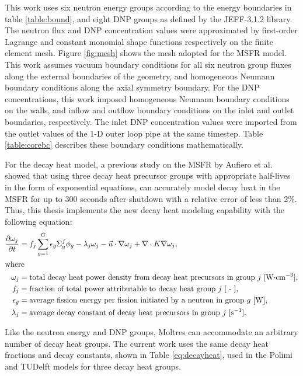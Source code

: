 This work uses six neutron energy groups according to the
energy boundaries in table \ref{table:bound}, and eight \gls{DNP} groups as
defined by the JEFF-3.1.2 library. The neutron flux
and \gls{DNP} concentration values were approximated by first-order Lagrange
and constant monomial shape functions respectively on the finite element mesh.
Figure \ref{fig:mesh} shows the mesh adopted for the \gls{MSFR} model.
This work assumes vacuum boundary conditions for all six neutron group fluxes
along the external boundaries of the geometry, and homogeneous Neumann
boundary conditions along the axial symmetry boundary. For the \gls{DNP}
concentrations, this work imposed homogeneous Neumann boundary conditions on
the walls, and inflow and outflow boundary conditions on the inlet and outlet
boundaries, respectively. The inlet \gls{DNP} concentration values were
imported from the outlet values of the 1-D outer loop pipe at the same
timestep. Table \ref{table:corebc} describes these boundary conditions
mathematically.

For the decay heat model, a previous study on the MSFR by Aufiero et al.
\cite{aufiero_extended_2013} showed that using three decay heat precursor
groups with appropriate half-lives in the form of exponential equations, can
accurately model decay heat in the MSFR for up to 300 seconds after shutdown
with a relative error of less than 2\%. Thus, this thesis implements the new
decay heat modeling capability with the following equation:
%
\begin{align}
	\frac{\partial \omega_j}{\partial t} &= f_j \sum^G_{g=1} \epsilon_{g}
	\Sigma^f_{g} \phi_{g} - \lambda_j \omega_j - \vec{u} \cdot \nabla
	\omega_j + \nabla \cdot K \nabla \omega_j, \label{eq:decayheat} \\
	\intertext{where}
    \omega_j &= \text{total decay heat power density from decay heat
    precursors in group $j$ [W$\cdot$cm$^{-3}$],} \nonumber \\
	f_j &= \text{fraction of total power attributable to decay heat group
	$j$ [ - ],} \nonumber \\
	\epsilon_g &= \text{average fission energy per fission initiated by a
	neutron in group $g$ [W],} \nonumber \\
	\lambda_j &= \text{average decay constant of decay heat precursors in
	group $j$ [s$^{-1}$].} \nonumber
\end{align}

Like the neutron energy and \gls{DNP} groups, Moltres can accommodate an
arbitrary number of decay heat groups. The current work uses the same decay
heat fractions and decay constants, shown in Table \ref{eq:decayheat}, used in
the Polimi and TUDelft models for three decay heat groups.

